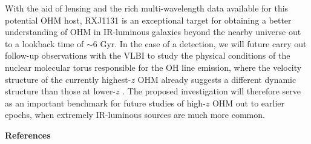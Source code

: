 \documentclass[letterpaper,11pt]{article}
\newcommand{\Lsun}{\mbox{$L_{\odot}$}\xspace}
\newcommand{\LFIR}{\mbox{$L_{\rm FIR}$}\xspace}
\newcommand{\LOH}{$L_{\rm OH}$\xspace}
\newcommand{\kms}{km\,s$^{-1}$\xspace}
\newcommand{\pmOne}{\mbox{$^{-1}$}\xspace}
\newcommand{\E}[1]{\mbox{$\times10^{#1}$}}
\newcommand{\eq}{\,=\,}
\newcommand{\obs}{observations\xspace}
\begin{document}
With the aid of lensing and the rich multi-wavelength data 
available for this potential OHM host, RXJ1131 is an exceptional target
for obtaining a better understanding of OHM in IR-luminous galaxies beyond the nearby universe out to
a lookback time of $\sim$6 Gyr.
In the case of a detection, we will future carry out follow-up \obs %
with the VLBI to study the physical conditions of the nuclear molecular torus
responsible for the OH line emission, where the velocity structure of the 
currently highest-$z$ OHM already suggests a different dynamic structure 
than those at lower-$z$ \citep{Baan92a}. %
The proposed investigation will therefore serve as an
important benchmark for future studies of high-$z$ OHM out to earlier epochs,
when extremely IR-luminous sources are much more common.



\noindent \textbf{References}
{\fontsize{10pt}{12pt}\selectfont
    
}
\end{document}
